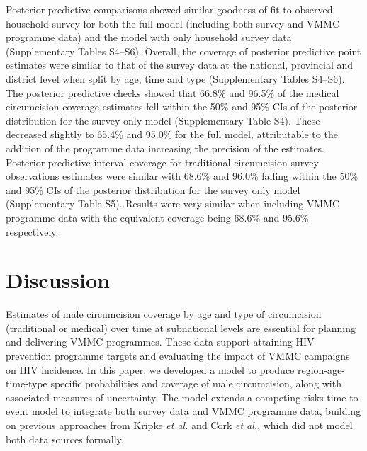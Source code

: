 \documentclass{article}
\begin{document}
Posterior predictive comparisons showed similar goodness-of-fit to observed household survey for both the full model (including both survey and VMMC programme data) and the model with only household survey data (Supplementary Tables S4--S6). Overall, the coverage of posterior predictive point estimates were similar to that of the survey data at the national, provincial and district level when split by age, time and type (Supplementary Tables S4--S6). The posterior predictive checks showed that 66.8\% and 96.5\% of the medical circumcision coverage estimates fell within the 50\% and 95\% CIs of the posterior distribution for the survey only model (Supplementary Table S4). These decreased slightly to 65.4\% and 95.0\% for the full model, attributable to the addition of the programme data increasing the precision of the estimates.  Posterior predictive interval coverage for traditional circumcision survey observations estimates were similar with 68.6\% and 96.0\% falling within the 50\% and 95\% CIs of the posterior distribution for the survey only model (Supplementary Table S5). Results were very similar when including VMMC programme data with the equivalent coverage being 68.6\% and 95.6\% respectively. 


\section*{Discussion}


Estimates of male circumcision coverage by age and type of circumcision (traditional or medical) over time at subnational levels are essential for planning and delivering VMMC programmes. These data support attaining HIV prevention programme targets and evaluating the impact of VMMC campaigns on HIV incidence. In this paper, we developed a model to produce region-age-time-type specific probabilities and  coverage of male circumcision, along with associated measures of uncertainty. The model extends a competing risks time-to-event model to integrate both survey data and VMMC programme data, building on previous approaches from Kripke \textit{et al.} \cite{kripke2016cost} and Cork \textit{et al.}\cite{cork2020mapping}, which did not model both data sources formally.
\end{document}
